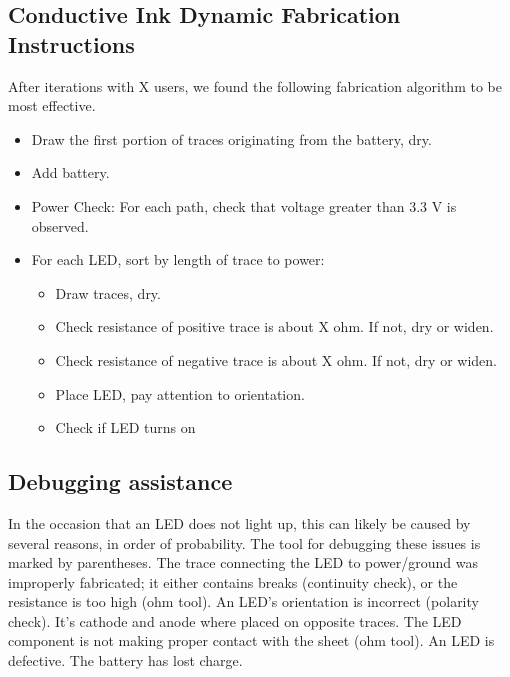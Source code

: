 \documentclass{sigchi}
\begin{document}
        \subsection{Conductive Ink Dynamic Fabrication Instructions}
        After iterations with X users, we found the following fabrication algorithm to be most effective.
        \begin{itemize}
            \item Draw the first portion of traces originating from the battery, dry.
            \item Add battery.
            \item Power Check: For each path, check that voltage greater than 3.3 V is observed.
            \item For each LED, sort by length of trace to power:
            \begin{itemize}
                \item Draw traces, dry.
                \item Check resistance of positive trace is about X ohm. If not, dry or widen.
                \item Check resistance of negative trace is about X ohm. If not, dry or widen.
                \item Place LED, pay attention to orientation.
                \item Check if LED turns on
            \end{itemize}
        \end{itemize}

    \subsection{Debugging assistance}
        In the occasion that an LED does not light up, this can likely be caused by several reasons, in order of probability.  The tool for debugging these issues is marked by parentheses.
        The trace connecting the LED to power/ground was improperly fabricated; it either contains breaks (continuity check), or the resistance is too high (ohm tool).
        An LED's orientation is incorrect (polarity check). It's cathode and anode where placed on opposite traces.
        The LED component is not making proper contact with the sheet (ohm tool).
        An LED is defective.
        The battery has lost charge.
\end{document}
